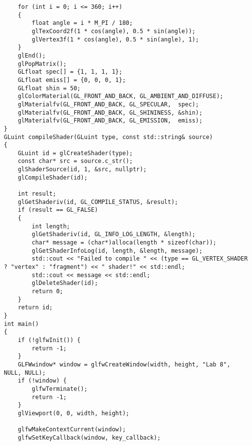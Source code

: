 \documentclass[a4paper, 14pt]{extarticle}
\begin{document}
\begin{verbatim}
    for (int i = 0; i <= 360; i++)
    {
        float angle = i * M_PI / 180;
        glTexCoord2f(1 * cos(angle), 0.5 * sin(angle));
        glVertex3f(1 * cos(angle), 0.5 * sin(angle), 1);
    }
    glEnd();
    glPopMatrix();
    GLfloat spec[] = {1, 1, 1, 1};
    GLfloat emiss[] = {0, 0, 0, 1};
    GLfloat shin = 50;
    glColorMaterial(GL_FRONT_AND_BACK, GL_AMBIENT_AND_DIFFUSE);
    glMaterialfv(GL_FRONT_AND_BACK, GL_SPECULAR,  spec);
    glMaterialfv(GL_FRONT_AND_BACK, GL_SHININESS, &shin);
    glMaterialfv(GL_FRONT_AND_BACK, GL_EMISSION,  emiss);
}
GLuint compileShader(GLuint type, const std::string& source)
{
    GLuint id = glCreateShader(type);
    const char* src = source.c_str();
    glShaderSource(id, 1, &src, nullptr);
    glCompileShader(id);

    int result;
    glGetShaderiv(id, GL_COMPILE_STATUS, &result);
    if (result == GL_FALSE)
    {
        int length;
        glGetShaderiv(id, GL_INFO_LOG_LENGTH, &length);
        char* message = (char*)alloca(length * sizeof(char));
        glGetShaderInfoLog(id, length, &length, message);
        std::cout << "Failed to compile " << (type == GL_VERTEX_SHADER ? "vertex" : "fragment") << " shader!" << std::endl;
        std::cout << message << std::endl;
        glDeleteShader(id);
        return 0;
    }
    return id;
}
int main()
{
    if (!glfwInit()) {
        return -1;
    }
    GLFWwindow* window = glfwCreateWindow(width, height, "Lab 8", NULL, NULL);
    if (!window) {
        glfwTerminate();
        return -1;
    }
    glViewport(0, 0, width, height);

    glfwMakeContextCurrent(window);
    glfwSetKeyCallback(window, key_callback);


\end{verbatim}
\end{document}
